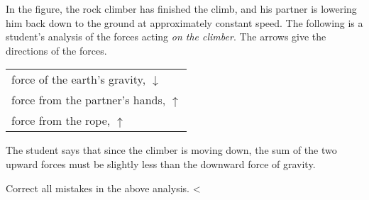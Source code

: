 In the figure, the rock climber has finished the climb, and his
partner is lowering him back down to the ground at
approximately constant speed. The following is a student's analysis of
the forces acting \emph{on the climber}. The arrows give the directions of the
forces.

\begin{tabular}{p{90mm}}
force of the earth's gravity, $\downarrow$ \\
force from the partner's hands, $\uparrow$ \\
force from the rope, $\uparrow$ \\
\end{tabular}

The student says that since the climber is moving down, the sum of the
two upward forces must be slightly less than the downward force of
gravity.

Correct all mistakes in the above analysis.
<%
